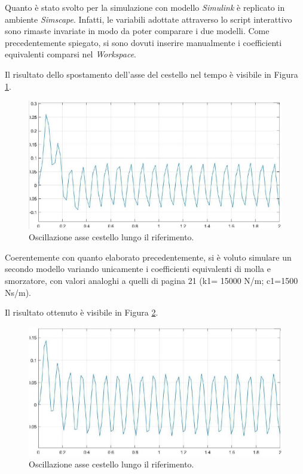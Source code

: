 Quanto è stato svolto per la simulazione con modello \textit{Simulink} è replicato in ambiente \textit{Simscape}. Infatti, le variabili adottate attraverso lo script interattivo sono rimaste invariate in modo da poter comparare i due modelli. Come precedentemente spiegato, si sono dovuti inserire manualmente i coefficienti equivalenti comparsi nel \textit{Workspace}. 

Il risultato dello spostamento dell'asse del cestello nel tempo è visibile in Figura \ref{PrimoPlotSimscape}.
\begin{figure}[h]
    \centering
    \includegraphics[scale=0.5]{PrimoPlotSimScape.JPG}
    \caption{Oscillazione asse cestello lungo il riferimento.}
    \label{PrimoPlotSimscape}
\end{figure}

Coerentemente con quanto elaborato precedentemente, si è voluto simulare un secondo modello variando unicamente i coefficienti equivalenti di molla e smorzatore, con valori analoghi a quelli di pagina 21 (k1= 15000 N/m; c1=1500 Ns/m).

Il risultato ottenuto è visibile in Figura \ref{SecondoPlotSimscape}.\\
\begin{figure}[h]
    \centering
    \includegraphics[scale=0.5]{SecondoPlotSimScape.JPG}
    \caption{Oscillazione asse cestello lungo il riferimento.}
    \label{SecondoPlotSimscape}
\end{figure}

